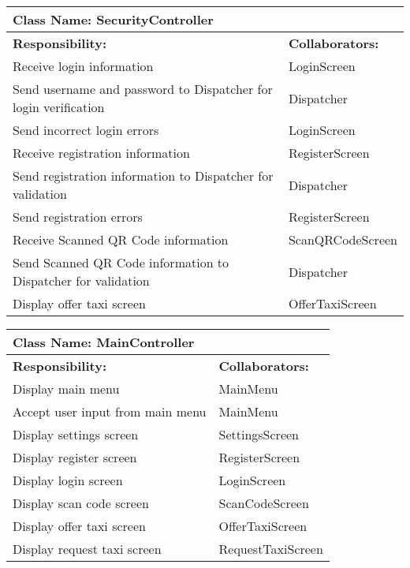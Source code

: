 \documentclass[english]{article}
\begin{document}
    \begin{table}[!ht]
        \centering
        \begin{tabular}{|p{8cm}|p{4cm}|}
        \hline 
        \multicolumn{2}{|l|}{\textbf{Class Name: SecurityController}} \\
        \hline
        \textbf{Responsibility:} & \textbf{Collaborators:} \\
        \hline
        Receive login information & LoginScreen \\
        \hline
        Send username and password to Dispatcher for login verification & Dispatcher\\
        \hline
        Send incorrect login errors & LoginScreen \\
        \hline
        Receive registration information & RegisterScreen \\
        \hline
        Send registration information to Dispatcher for validation & Dispatcher \\
        \hline
        Send registration errors & RegisterScreen \\
        \hline
        Receive Scanned QR Code information & ScanQRCodeScreen\\
        \hline
        Send Scanned QR Code information to Dispatcher for validation & Dispatcher \\
        \hline
        Display offer taxi screen & OfferTaxiScreen \\
        \hline
        \end{tabular}
    \end{table} 
    
    \begin{table}[!ht]
        \centering
        \begin{tabular}{|p{8cm}|p{4cm}|}
        \hline 
        \multicolumn{2}{|l|}{\textbf{Class Name: MainController}} \\
        \hline
        \textbf{Responsibility:} & \textbf{Collaborators:} \\
        \hline
        Display main menu & MainMenu\\
        \hline
        Accept user input from main menu & MainMenu \\
        \hline
        Display settings screen & SettingsScreen\\
        \hline
        Display register screen & RegisterScreen\\
        \hline
        Display login screen & LoginScreen\\
        \hline
        Display scan code screen & ScanCodeScreen\\
        \hline
        Display offer taxi screen & OfferTaxiScreen\\
        \hline
        Display request taxi screen & RequestTaxiScreen\\
        \hline
        \end{tabular}
    \end{table}
    
\end{document}
